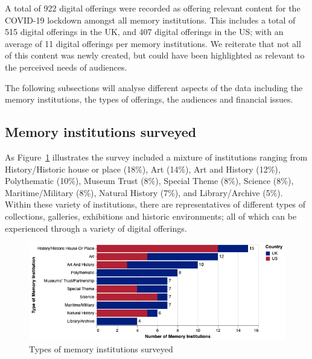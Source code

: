 \documentclass{egpubl}
\begin{document}
A total of 922 digital offerings were recorded as offering relevant content for the COVID-19 lockdown amongst all memory institutions. This includes a total of 515 digital offerings in the UK, and 407 digital offerings in the US; with an average of 11 digital offerings per memory institutions. We reiterate that not all of this content was newly created, but could have been highlighted as relevant to the perceived needs of audiences. 


The following subsections will analyse different aspects of the data including the memory institutions, the types of offerings, the audiences and financial issues.

\subsection{Memory institutions surveyed}
\label{inst}
As Figure~\ref{fig:MType} illustrates the survey included a mixture of institutions ranging from History/Historic house or place (18\%), Art (14\%), Art and History (12\%), Polythematic (10\%), Museum Trust (8\%), Special Theme (8\%), Science (8\%), Maritime/Military (8\%), Natural History (7\%), and Library/Archive (5\%). Within these variety of institutions, there are representatives of different types of collections, galleries, exhibitions and historic environments; all of which can be experienced through a variety of digital offerings. 


\begin{figure}[h]
  \centering
  \includegraphics[width=\linewidth]{images/museumtype.png}
  \caption{\label{fig:MType}
           Types of memory institutions surveyed}
\end{figure}
\end{document}
